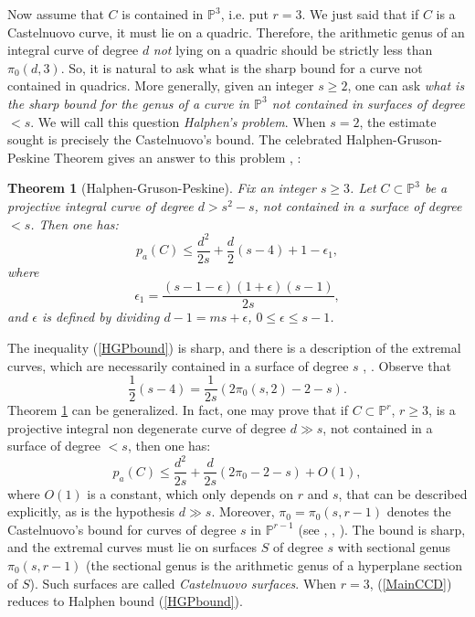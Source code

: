 \documentclass[9pt,a4paper]{amsart}
\theoremstyle{plain}
\newtheorem{theorem}{Theorem}[section]
\theoremstyle{definition}
\theoremstyle{remark}
\begin{document}
\smallskip
Now assume that $C$ is contained in $\mathbb P^3$, i.e. put $r=3$.
We just said that if $C$ is a Castelnuovo curve, it must lie on a
quadric. Therefore, the arithmetic genus of an integral curve of
degree $d$ {\it not} lying on a quadric should be strictly less than
$\pi_0(d,3)$. So, it is natural to ask what is the sharp bound for a
curve not contained in quadrics. More generally, given an integer $s
\geq 2$, one can ask {\it what is the sharp bound for the genus of a
curve in $\mathbb P^3$ not contained in surfaces of degree $<s$}. We
will call this question {\it Halphen's problem}. When
$s=2$, the estimate sought is precisely the Castelnuovo's bound. The
celebrated Halphen-Gruson-Peskine Theorem  gives an answer to this
problem \cite[Th\'eor\`eme 3.1]{GP}, \cite[10.8.Teorema]{Ellia}:
\begin{theorem}[Halphen-Gruson-Peskine]\label{HGP}
Fix an integer $s\geq 3$. Let $C\subset \mathbb P^3$ be a projective
integral curve of degree $d>s^2-s$, not contained in a surface of
degree $<s$. Then one has:
\begin{equation}\label{HGPbound}
p_a(C) \leq \frac{d^2}{2s}+\frac{d}{2}(s-4)+1-\epsilon_1,
\end{equation}
where $$\epsilon_1=\frac{(s-1-\epsilon)(1+\epsilon)(s-1)}{2s},$$ and
$\epsilon$ is defined by dividing $d-1=ms+\epsilon$, $0\leq
\epsilon\leq s-1$.
\end{theorem}
The inequality (\ref{HGPbound}) is sharp, and there is a description
of the extremal curves, which are necessarily contained in a surface
of degree $s$ \cite{GP}, \cite{Ellia}. Observe that
\begin{equation}\label{cfrLiu}
\frac{1}{2}(s-4)=\frac{1}{2s}(2\pi_0(s,2)-2-s).
\end{equation}
Theorem \ref{HGP} can be generalized. In fact, one may prove that if
$C\subset \mathbb P^r$, $r\geq 3$, is a projective integral non degenerate curve of
degree $d\gg s$, not contained in a surface of degree $<s$, then one
has:
\begin{equation}\label{MainCCD}
p_a(C) \leq \frac{d^2}{2s}+\frac{d}{2s}(2\pi_0-2-s)+O(1),
\end{equation}
where $O(1)$ is a constant, which only depends on $r$ and $s$, that
can be described explicitly, as is the hypothesis $d\gg s$.
Moreover, $\pi_0=\pi_0(s,r-1)$ denotes the Castelnuovo's bound for
curves of degree $s$ in $\mathbb P^{r-1}$ (see
\cite{EH}, \cite{Harris2}, \cite[Main Theorem]{CCD}). The bound is sharp, and
the extremal curves must lie on surfaces $S$ of degree $s$ with
sectional genus $\pi_0(s,r-1)$ (the sectional genus is the arithmetic
genus of a hyperplane section of $S$). Such surfaces are called {\it
Castelnuovo surfaces}.
When $r=3$, (\ref{MainCCD}) reduces to Halphen bound (\ref{HGPbound}).
\end{document}

